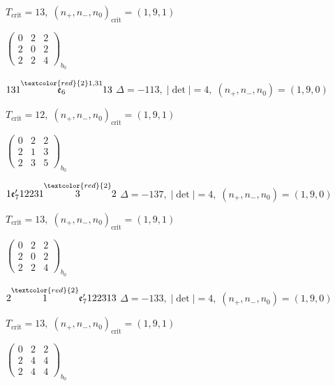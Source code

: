 \documentclass[10pt]{article}
\begin{document}
\hspace{1em}$T_{\text{crit}}=13,\; (n_+,n_-,n_0)_{\text{crit}}=(1,9,1)$

\hspace{2em}$\left(\begin{smallmatrix}0 & 2 & 2 \\ 2 & 0 & 2 \\ 2 & 2 & 4\end{smallmatrix}\right)_{\!b_0}$

$131\overset{\textcolor{red}{2}1,31}{\mathfrak{e}_6}13$ \quad $\Delta=-113,\; |\det|=4,\; (n_+,n_-,n_0)=(1,9,0)$

\hspace{1em}$T_{\text{crit}}=12,\; (n_+,n_-,n_0)_{\text{crit}}=(1,9,1)$

\hspace{2em}$\left(\begin{smallmatrix}0 & 2 & 2 \\ 2 & 1 & 3 \\ 2 & 3 & 5\end{smallmatrix}\right)_{\!b_0}$

\smallskip

$1\mathfrak{e}_7'12231\overset{\textcolor{red}{2}}{3}2$ \quad $\Delta=-137,\; |\det|=4,\; (n_+,n_-,n_0)=(1,9,0)$

\hspace{1em}$T_{\text{crit}}=13,\; (n_+,n_-,n_0)_{\text{crit}}=(1,9,1)$

\hspace{2em}$\left(\begin{smallmatrix}0 & 2 & 2 \\ 2 & 0 & 2 \\ 2 & 2 & 4\end{smallmatrix}\right)_{\!b_0}$

\smallskip

$2\overset{\textcolor{red}{2}}{1}\mathfrak{e}_7'122313$ \quad $\Delta=-133,\; |\det|=4,\; (n_+,n_-,n_0)=(1,9,0)$

\hspace{1em}$T_{\text{crit}}=13,\; (n_+,n_-,n_0)_{\text{crit}}=(1,9,1)$

\hspace{2em}$\left(\begin{smallmatrix}0 & 2 & 2 \\ 2 & 4 & 4 \\ 2 & 4 & 4\end{smallmatrix}\right)_{\!b_0}$
\end{document}
